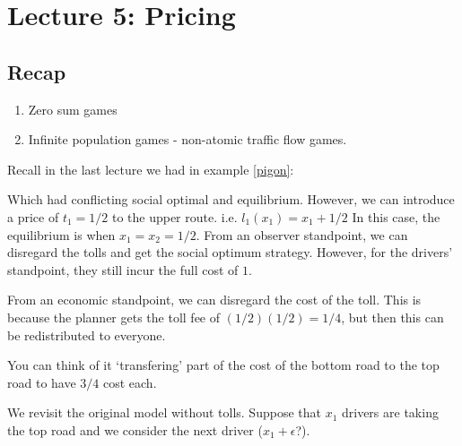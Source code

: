 \section{Lecture 5: Pricing}
\newsection
\subsection*{Recap}
\begin{enumerate}
    \item Zero sum games
    \item Infinite population games - non-atomic traffic flow games.
\end{enumerate}
Recall in the last lecture we had in example \ref{pigon}:
\begin{center}
\end{center}
Which had conflicting social optimal and equilibrium. However, we can introduce a price of $t_1=1/2$ to the upper route. i.e. $l_1(x_1)=x_1+1/2$ In this case, the equilibrium is when $x_1=x_2=1/2$. From an observer standpoint, we can disregard the tolls and get the social optimum strategy. However, for the drivers' standpoint, they still incur the full cost of $1$.

From an economic standpoint, we can disregard the cost of the toll. This is because the planner gets the toll fee of $(1/2)(1/2)=1/4$, but then this can be redistributed to everyone. 
\begin{remark}
    You can think of it `transfering' part of the cost of the bottom road to the top road to have $3/4$ cost each.
\end{remark}

We revisit the original model without tolls. Suppose that $x_1$ drivers are taking the top road and we consider the next driver ($x_1+\epsilon$?).


